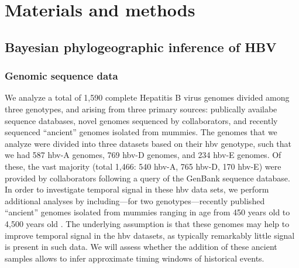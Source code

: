 \chapter{Materials and methods}
\label{ch:methodology}

%

\section{Bayesian phylogeographic inference of HBV}

\subsection{Genomic sequence data}
We analyze a total of 1,590 complete Hepatitis B virus genomes divided among three genotypes, and arising from three primary sources: publically availabe sequence databases, novel genomes sequenced by collaborators, and recently sequenced ``ancient'' genomes isolated from mummies.
The genomes that we analyze were divided into three datasets based on their \gls{hbv} genotype, such that we had 587 \gls{hbv}-A genomes, 769 \gls{hbv}-D genomes, and 234 \gls{hbv}-E genomes.
Of these, the vast majority (total 1,466: 540 \gls{hbv}-A, 765 \gls{hbv}-D, 170 \gls{hbv}-E) were provided by collaborators following a query of the GenBank sequence database. %
In order to investigate temporal signal in these \gls{hbv} data sets, we perform additional analyses by including---for two genotypes---recently published ``ancient'' genomes isolated from mummies ranging in age from 450 years old to 4,500 years old \cite{muhlemann2018ancient, ross2018paradox}.
The underlying assumption is that these genomes may help to improve temporal signal in the \gls{hbv} datasets, as typically remarkably little signal is present in such data.
We will assess whether the addition of these ancient samples allows to infer approximate timing windows of historical events.

